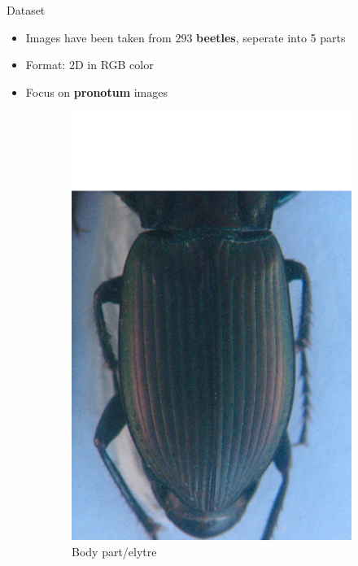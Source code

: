 \documentclass[10pt,svgnames]{beamer}
\begin{document}


\begin{frame}[c]{Dataset}
	\begin{itemize}
    	\item Images have been taken from $293$ \textbf{beetles}, seperate into 5 parts
    	\item Format: $2$D in RGB color
    	\item Focus on \textbf{\color{red}pronotum} images
  	\end{itemize}
	
	\begin{figure}[htbp]
    			\begin{subfigure}[t]{0.3\textwidth}
        			\centering
        			\includegraphics[scale=.2]{images/elytre2}
        			\caption*{\footnotesize{Body part/elytre}}
        			\label{figsub22}
    			\end{subfigure}
    			~ 
    			\begin{subfigure}[t]{0.3\textwidth}

\end{subfigure}
\end{figure}
\end{frame}
\end{document}
